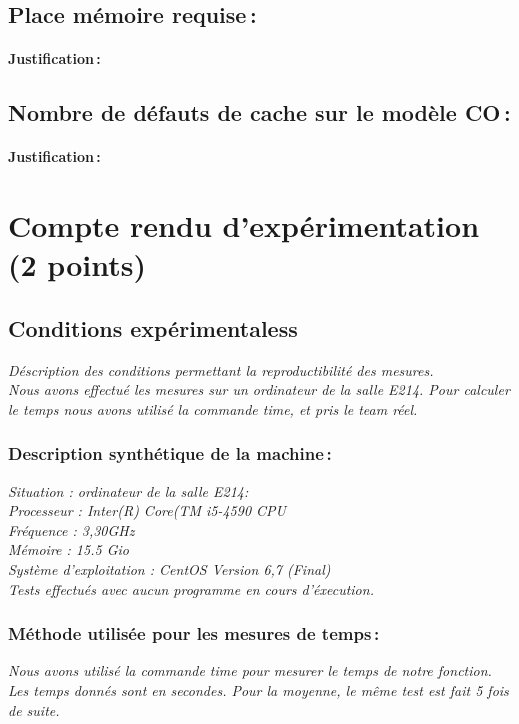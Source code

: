 \documentclass[a4paper, 10pt, french]{article}
\begin{document}
  \subsection{Place mémoire requise\,: }
    \paragraph{Justification\,: }

  \subsection{Nombre de défauts de cache sur le modèle CO\,: }
    \paragraph{Justification\,: }


\section{Compte rendu d'expérimentation (2 points)}
  \subsection{Conditions expérimentaless}
     {\em Déscription des conditions permettant la reproductibilité des mesures.\\
      Nous avons effectué les mesures sur un ordinateur de la salle E214.
      Pour calculer le temps nous avons utilisé la commande time, et pris le team réel.
     }

    \subsubsection{Description synthétique de la machine\,:} 
      {\em 
       Situation : ordinateur de la salle E214: \\
       Processeur : Inter(R) Core(TM i5-4590 CPU \\
       Fréquence : 3,30GHz \\
       Mémoire : 15.5 Gio \\ 
       Système d'exploitation : CentOS Version 6,7 (Final) \\
       Tests effectués avec aucun programme en cours d'éxecution. \\
      } 

    \subsubsection{Méthode utilisée pour les mesures de temps\,: } 
      {\em 
        Nous avons utilisé la commande time pour mesurer le temps de notre fonction. Les temps donnés sont en secondes.
Pour la moyenne, le même test est fait 5 fois de suite.
      }
\end{document}
